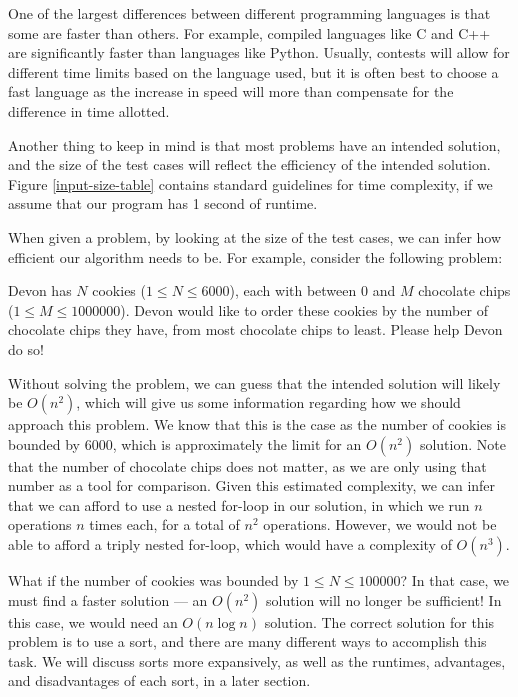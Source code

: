 One of the largest differences between different programming languages is that some are faster than others.  For example, compiled languages like C and C++ are significantly faster than languages like Python.  Usually, contests will allow for different time limits based on the language used, but it is often best to choose a fast language as the increase in speed will more than compensate for the difference in time allotted.

Another thing to keep in mind is that most problems have an intended solution, and the size of the test cases will reflect the efficiency of the intended solution.  Figure \ref{input-size-table} contains standard guidelines for time complexity, if we assume that our program has 1 second of runtime.



When given a problem, by looking at the size of the test cases, we can infer how efficient our algorithm needs to be.  For example, consider the following problem:

\begin{Problem}
Devon has $ N $ cookies ($ 1 \leq N \leq 6000 $), each with between $ 0 $ and $ M $ chocolate chips ($ 1 \leq M \leq 1000000 $).  Devon would like to order these cookies by the number of chocolate chips they have, from most chocolate chips to least.  Please help Devon do so!
\end{Problem}

Without solving the problem, we can guess that the intended solution will likely be $ O(n^2) $, which will give us some information regarding how we should approach this problem.  We know that this is the case as the number of cookies is bounded by $ 6000 $, which is approximately the limit for an $ O(n^2) $ solution.  Note that the number of chocolate chips does not matter, as we are only using that number as a tool for comparison.  Given this estimated complexity, we can infer that we can afford to use a nested for-loop in our solution, in which we run $ n $ operations $ n $ times each, for a total of $ n^2 $ operations. However, we would not be able to afford a triply nested for-loop, which would have a complexity of $ O(n^3) $.

What if the number of cookies was bounded by $ 1 \leq N \leq 100000 $?  In that case, we must find a faster solution --- an $ O(n^2) $ solution will no longer be sufficient! In this case, we would need an $ O(n\log n) $ solution.  The correct solution for this problem is to use a sort, and there are many different ways to accomplish this task.  We will discuss sorts more expansively, as well as the runtimes, advantages, and disadvantages of each sort, in a later section.

